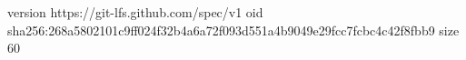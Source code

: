 version https://git-lfs.github.com/spec/v1
oid sha256:268a5802101c9ff024f32b4a6a72f093d551a4b9049e29fcc7fcbc4c42f8fbb9
size 60
